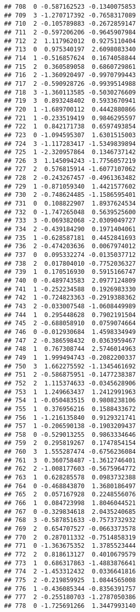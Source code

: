 \documentclass[
]{article}
\begin{document}
\begin{verbatim}
## 708  0 -0.587162523 -0.1340075853
## 709  3 -1.270717392 -0.7658317089
## 710  2 -0.105789883 -0.2672859147
## 711  2 -0.597206206 -0.9645907984
## 712  2  1.117962012  0.9275110404
## 713  0  0.975340197  2.6098083340
## 714  1 -0.516857624  0.1674058844
## 715  2  0.360589058  0.6860729861
## 716  2 -1.360920497 -0.9970799443
## 717  2 -0.590928726 -0.9939514988
## 718  3 -1.360113585 -0.5030276609
## 719  3  0.893248402  0.5933670941
## 720  1 -1.689700112  0.4442880866
## 721  1 -0.233519419  0.9846295597
## 722  1  0.842171738  0.6597493854
## 723  0 -1.094595307  1.6301515003
## 724  3 -1.117283417 -1.5349839894
## 725  1 -2.320957864  0.1346737142
## 726  3  1.145094243 -1.7756057219
## 727  2  0.576815914 -1.6077107062
## 728  2 -0.243267457 -0.4961363482
## 729  1 -0.871059340  1.4421577602
## 730  2 -0.748624485 -1.1586595401
## 731  0  0.108822907  1.8937624534
## 732  0 -1.747265048  0.5639525600
## 733  3 -0.069382068 -2.0309049727
## 734  2 -0.439184290  0.1971404061
## 735  1 -0.628587181  0.4452841693
## 736  2 -0.474203636  0.0067974012
## 737  0  0.095332274 -0.0135037712
## 738  2  0.017804010 -0.7752036327
## 739  1  0.170516930  0.5915166747
## 740  0 -0.489743583  2.0977124809
## 741  1 -0.252234588  0.1926983330
## 742  1 -0.724823363 -0.2919388362
## 743  2 -0.033007548 -1.0608449989
## 744  1  0.295448628  0.7902191504
## 745  2 -0.688058910  0.0759074664
## 746  0 -0.012930684  1.4598334949
## 747  2 -0.386598432  0.0363959467
## 748  1  0.767308744  2.5746014963
## 749  1  1.999494743 -0.2082200337
## 750  3  1.662275592 -1.1345461692
## 751  2 -0.586875951 -0.1477238387
## 752  2  1.115374633 -0.0345628906
## 753  1  1.249663437  1.2412991963
## 754  1 -0.050483515  0.9808238106
## 755  1  0.376956216  0.1588433672
## 756  1 -1.216135840  0.9129321741
## 757  1 -0.206590138 -0.1903209437
## 758  0 -0.529013255  0.9863334646
## 759  2  0.295819267  0.1747854154
## 760  3  1.555287474 -0.6756236084
## 761  3  0.360758487 -1.3612746401
## 762  2 -1.008177603 -0.5675964772
## 763  1  0.628285578  0.0983732388
## 764  0 -0.468843870  1.3680186497
## 765  2  0.057167928  0.2248556076
## 766  1  0.084723998  1.8046044521
## 767  0 -0.329834618  2.0435240685
## 768  3 -0.587851633 -0.7573732932
## 769  2  0.654707527 -0.0663373578
## 770  2  0.287011332 -0.7514858319
## 771  0 -1.363675352  1.3785523444
## 772  2  0.818613127  0.4010679579
## 773  1  0.686317863 -1.4883876641
## 774  2 -1.453312432  0.0336641816
## 775  2 -0.219859925  1.0844565008
## 776  1 -0.436085344 -0.8356391757
## 777  2 -0.255180703 -1.2787050386
## 778  0 -1.725691266  1.3447993140

\end{verbatim}
\end{document}
